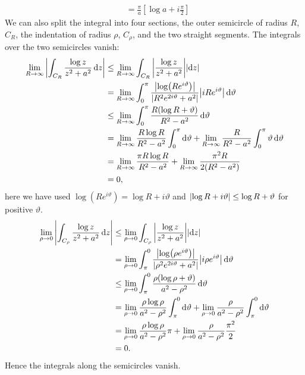 \documentclass{article}
\begin{document}
\begin{example}
\begin{align*}
            &= \frac{\pi}{a}\left[ \log a + i\frac{\pi}{2} \right]
        \end{align*}
        We can also split the integral into four sections, the outer semicircle of radius \(R\), \(C_R\), the indentation of radius \(\rho\), \(C_\rho\), and the two straight segments.
        The integrals over the two semicircles vanish:
        \begin{align*}
            \lim_{R\to\infty} \abs{\int_{C_R} \frac{\log z}{z^2 + a^2} \dd{z}} &\le \lim_{R\to\infty} \int_{C_R} \abs{\frac{\log z}{z^2 + a^2}}\abs{\dd{z}}\\
            &= \lim_{R\to\infty} \int_{0}^{\pi} \frac{\abs{\log(Re^{i\vartheta})}}{\abs{R^2e^{2i\vartheta} + a^2}}\abs{iRe^{i\vartheta}}\dd{\vartheta}\\
            &\le \lim_{R\to\infty} \int_{0}^{\pi} \frac{R(\log R + \vartheta)}{R^2 - a^2}\dd{\vartheta}\\
            &= \lim_{R\to\infty} \frac{R\log R}{R^2 - a^2}\int_{0}^{\pi} \dd{\vartheta} + \lim_{R\to\infty} \frac{R}{R^2 - a^2} \int_{0}^{\pi} \vartheta \dd{\vartheta}\\
            &= \lim_{R\to\infty} \frac{\pi R\log R}{R^2 - a^2} + \lim_{R\to\infty} \frac{\pi^2 R}{2(R^2 - a^2)}\\
            &= 0,
        \end{align*}
        here we have used \(\log(Re^{i\vartheta}) = \log R + i\vartheta\) and \(\abs{\log R + i\vartheta} \le \log R + \vartheta\) for positive \(\vartheta\).
        \begin{align*}
            \lim_{\rho\to 0} \abs{\int_{C_\rho} \frac{\log z}{z^2 + a^2}\dd{z}} &\le \lim_{\rho\to 0} \int_{C_\rho} \abs{\frac{\log z}{z^2 + a^2}} \abs{\dd{z}}\\
            &= \lim_{\rho\to 0} \int_{\pi}^{0} \frac{\abs{\log(\rho e^{i\vartheta})}}{\abs{\rho^2e^{2i\vartheta} + a^2}} \abs{i\rho e^{i\vartheta}}\dd{\vartheta}\\
            &\le \lim_{\rho\to 0} \int_{\pi}^{0} \frac{\rho(\log\rho + \vartheta)}{a^2 - \rho^2} \dd{\vartheta}\\
            &= \lim_{\rho\to 0}  \frac{\rho\log \rho}{a^2 - \rho^2} \int_{\pi}^{0} \dd{\vartheta} + \lim_{\rho\to 0} \frac{\rho}{a^2 - \rho^2} \int_{\pi}^{0}\dd{\vartheta}\\
            &= \lim_{\rho\to 0} \frac{\rho\log \rho}{a^2 - \rho^2}\pi + \lim_{\rho\to 0} \frac{\rho}{a^2 - \rho^2}\frac{\pi^2}{2}\\
            &= 0.
        \end{align*}
        Hence the integrals along the semicircles vanish.
        

\end{example}
\end{document}
